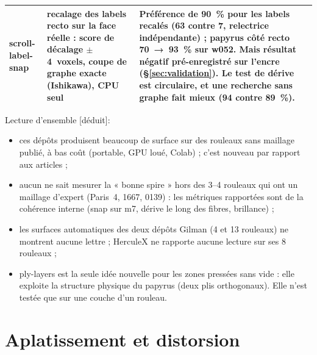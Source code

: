 \documentclass[11pt,a4paper]{article}
\newcommand{\deduit}{\textsf{\small[déduit]}}
\begin{document}
\begin{longtable}{@{}p{2.7cm}p{4.2cm}p{7.9cm}@{}}
scroll-label-snap \cite{snyder2026} & recalage des labels recto sur la face réelle : score de décalage $\pm$4~voxels, coupe de graphe exacte (Ishikawa), CPU seul & Préférence de 90~\% pour les labels recalés (63 contre 7, relectrice indépendante) ; papyrus côté recto 70~→~93~\% sur w052. Mais résultat \textbf{négatif} pré-enregistré sur l'encre (§\ref{sec:validation}). Le test de dérive est circulaire, et une recherche sans graphe fait mieux (94 contre 89~\%). \\
\bottomrule
\end{longtable}

\noindent Lecture d'ensemble \deduit :
\begin{itemize}
  \item ces dépôts produisent beaucoup de surface sur des rouleaux sans maillage publié, à
  bas coût (portable, GPU loué, Colab) ; c'est nouveau par rapport aux articles ;
  \item aucun ne sait mesurer la « bonne spire » hors des 3–4 rouleaux qui ont un maillage
  d'expert (Paris~4, 1667, 0139) : les métriques rapportées sont de la cohérence interne
  (snap sur m7, dérive le long des fibres, brillance) ;
  \item les surfaces automatiques des deux dépôts Gilman (4 et 13 rouleaux) ne montrent
  aucune lettre ;
  HerculeX ne rapporte aucune lecture sur ses 8 rouleaux ;
  \item ply-layers est la seule idée nouvelle pour les zones pressées sans vide : elle
  exploite la structure physique du papyrus (deux plis orthogonaux). Elle n'est testée que
  sur une couche d'un rouleau.
\end{itemize}

\section{Aplatissement et distorsion}
\end{document}
